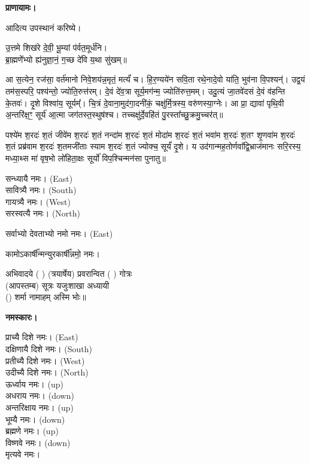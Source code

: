 \textbf{प्राणायामः।}


आदित्य उपस्थानं करिष्ये।

उ॒त्तमे शिख॑रे दे॒वी॒ भू॒म्यां प॑र्वत॒मूर्ध॑नि।\\
ब्रा॒ह्मणे॑॑भ्यो ह्य॑नुज्ञा॒नं॒ ग॒च्छ दे॑वि य॒था सु॑खम्॥



आ स॒त्येन॒ रज॑सा॒ वर्त॑मानो निवे॒शय॑न्न॒मृतं॒ मर्त्यं॑ च। हि॒र॒ण्यये॑न सवि॒ता रथे॒नादे॒वो या॑ति॒ भुव॑ना वि॒पश्यन्॑। उद्व॒यं तम॑स॒स्परि॒ पश्य॑न्तो॒ ज्योति॒रुत्त॑रम्। दे॒वं दे॑व॒त्रा सूर्य॒मग॑न्म॒ ज्योति॑रुत्त॒मम्। उदु॒त्यं जा॒तवे॑दसं दे॒वं व॑हन्ति के॒तवः॑। दृ॒शे विश्वा॑य॒ सूर्यम्᳚। चि॒त्रं दे॒वाना॒मुद॑गा॒दनी॑कं॒ चक्षु॑र्मि॒त्रस्य॒ वरु॑णस्या॒ग्नेः। आ प्रा॒ द्यावा॑ पृथि॒वी अ॒न्तरि॑क्ष॒ꣳ॒ सूर्य॑ आ॒त्मा जग॑तस्त॒स्थुष॑श्च। तच्चक्षु॑र्दे॒वहि॑तं पु॒रस्ता᳚च्छु॒क्रमु॒च्चर॑त्॥

पश्ये॑म श॒रदः॑ श॒तं जीवे॑म श॒रदः॑ श॒तं नन्दा॑म श॒रदः॑ श॒तं मोदा॑म श॒रदः॑ श॒तं भवा॑म श॒रदः॑ श॒तꣳ शृ॒णवा॑म श॒रदः॑ श॒तं प्रब्र॑वाम श॒रदः॑ श॒तमजी॑ताः स्याम श॒रदः॑ श॒तं ज्योक्च॒ सूर्यं॑ दृ॒शे। य उद॑गान्मह॒तोर्णवा᳚द्वि॒भ्राज॑मानः सरि॒रस्य॒ मध्या॒थ्स मा॑ वृष॒भो लो॑हिता॒क्षः सूर्यो॑ विप॒श्चिन्मन॑सा पुनातु॥



सन्ध्यायै नमः।  {\scriptsize (East)}\\
सावित्र्यै नमः। {\scriptsize (South)}\\
गायत्र्यै नमः।  {\scriptsize (West)}\\
सरस्वत्यै नमः।  {\scriptsize (North)}

सर्वाभ्यो देवताभ्यो नमो नमः। {\scriptsize (East)}

कामोऽकार्\mbox{}षी᳚न्मन्युरकार्\mbox{}षी᳚न्नमो॒ नमः।

अभिवादये ( ) (त्रयार्षेय) प्रवरान्वित ( ) गोत्रः\\
(आपस्तम्ब) सूत्रः यजुःशाखा अध्यायी\\
() शर्मा नामाहम् अस्मि भोः॥

\textbf{नमस्कारः।}


प्राच्यै दिशे नमः।   {\scriptsize (East)}\\
दक्षिणायै दिशे नमः।  {\scriptsize (South)}\\
प्रतीच्यै दिशे नमः।   {\scriptsize (West)}\\
उदीच्यै दिशे नमः।   {\scriptsize (North)}\\
ऊर्ध्वाय नमः।   {\scriptsize (up)}\\
अधराय नमः।   {\scriptsize (down)}\\
अन्तरिक्षाय नमः। {\scriptsize (up)}\\
भूम्यै नमः। {\scriptsize (down)}\\
ब्रह्मणे नमः। {\scriptsize (up)}\\
विष्णवे नमः।  {\scriptsize (down)}\\
मृत्यवे नमः।

